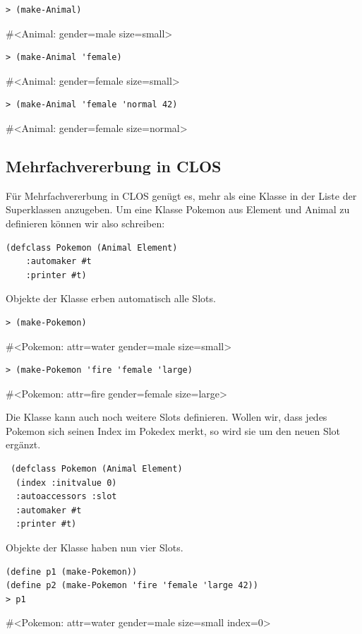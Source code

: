 \begin{lstlisting}
> (make-Animal)
\end{lstlisting}
{\routput \#<Animal: gender=male size=small>}

\begin{lstlisting}
> (make-Animal 'female)
\end{lstlisting}
{\routput \#<Animal: gender=female size=small>}

\begin{lstlisting}
> (make-Animal 'female 'normal 42)
\end{lstlisting}
{\routput \#<Animal: gender=female size=normal>}

\subsection{Mehrfachvererbung in CLOS}
Für Mehrfachvererbung in CLOS genügt es, mehr als eine Klasse in der Liste der Superklassen anzugeben. Um eine Klasse Pokemon aus Element und Animal zu definieren können wir also schreiben:

\begin{lstlisting}
(defclass Pokemon (Animal Element)
    :automaker #t
    :printer #t)
\end{lstlisting}

Objekte der Klasse erben automatisch alle Slots.

\begin{lstlisting}
> (make-Pokemon)
\end{lstlisting}
{\routput \#<Pokemon: attr=water gender=male size=small>}

\begin{lstlisting}
> (make-Pokemon 'fire 'female 'large)
\end{lstlisting}
{\routput \#<Pokemon: attr=fire gender=female size=large>}

Die Klasse kann auch noch weitere Slots definieren. Wollen wir, dass jedes Pokemon sich seinen Index im Pokedex merkt, so wird sie um den neuen Slot ergänzt.

\begin{lstlisting}
 (defclass Pokemon (Animal Element)
  (index :initvalue 0)
  :autoaccessors :slot
  :automaker #t
  :printer #t)
\end{lstlisting}

Objekte der Klasse haben nun vier Slots.

\begin{lstlisting}
(define p1 (make-Pokemon))
(define p2 (make-Pokemon 'fire 'female 'large 42))
> p1
\end{lstlisting}
{\routput \#<Pokemon: attr=water gender=male size=small index=0>}

